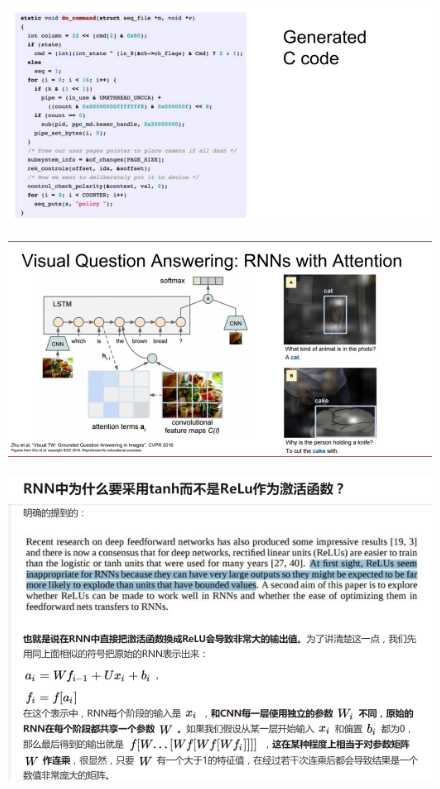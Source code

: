 \documentclass[11pt]{article}
\makeatletter
\def\maxwidth{\ifdim\Gin@nat@width>\linewidth\linewidth
    \else\Gin@nat@width\fi}
\let\Oldincludegraphics\includegraphics
\renewcommand{\includegraphics}[1]{\Oldincludegraphics[width=.8\maxwidth]{#1}}
\makeatother
\begin{document}
    \begin{figure}
\centering
\includegraphics{rnn-code.png}
\caption{}
\end{figure}

    \begin{figure}
\centering
\includegraphics{rnn-answer.png}
\caption{}
\end{figure}

    \begin{figure}
\centering
\includegraphics{rnn-hard.png}
\caption{}
\end{figure}
\end{document}
